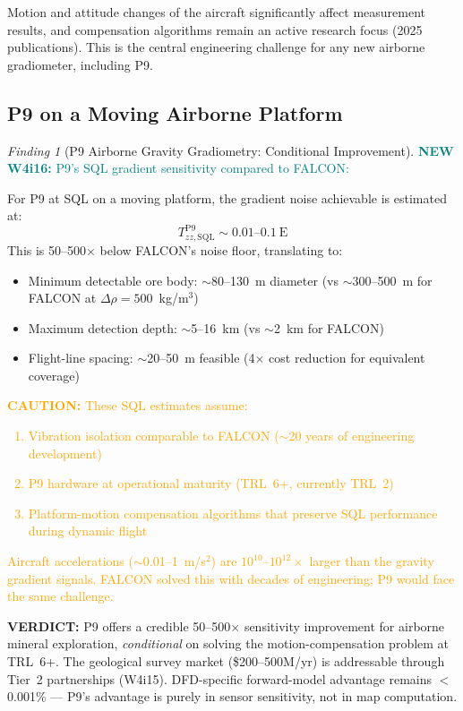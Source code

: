 \documentclass[11pt]{article}
\theoremstyle{definition}
\theoremstyle{remark}
\newtheorem{finding}[theorem]{Finding}
\newcommand{\caution}[1]{\textcolor{orange}{\textbf{CAUTION:} #1}}
\newcommand{\verdict}[1]{\textcolor{green!50!black}{\textbf{VERDICT:} #1}}
\newcommand{\newfinding}[1]{\textcolor{teal}{\textbf{NEW W4i16:} #1}}
\begin{document}
Motion and attitude changes of the aircraft significantly affect
measurement results, and compensation algorithms remain an active
research focus (2025 publications). This is the central engineering
challenge for any new airborne gradiometer, including P9.

\subsection{P9 on a Moving Airborne Platform}

\begin{finding}[P9 Airborne Gravity Gradiometry: Conditional Improvement]
\label{find:agg-p9}
\newfinding{P9's SQL gradient sensitivity compared to FALCON:}

For P9 at SQL on a moving platform, the gradient noise achievable
is estimated at:
\begin{equation}
T_{zz,\mathrm{SQL}}^{\mathrm{P9}} \sim 0.01\text{--}0.1~\mathrm{E}
\end{equation}
This is 50--500$\times$ below FALCON's noise floor, translating to:
\begin{itemize}[nosep]
  \item Minimum detectable ore body: $\sim$80--130~m diameter
    (vs $\sim$300--500~m for FALCON at $\Delta\rho = 500$~kg/m$^3$)
  \item Maximum detection depth: $\sim$5--16~km
    (vs $\sim$2~km for FALCON)
  \item Flight-line spacing: $\sim$20--50~m feasible
    (4$\times$ cost reduction for equivalent coverage)
\end{itemize}

\caution{These SQL estimates assume:
\begin{enumerate}[nosep]
  \item Vibration isolation comparable to FALCON ($\sim$20 years
    of engineering development)
  \item P9 hardware at operational maturity (TRL~6+, currently TRL~2)
  \item Platform-motion compensation algorithms that preserve
    SQL performance during dynamic flight
\end{enumerate}
Aircraft accelerations ($\sim$0.01--1~m/s$^2$) are
$10^{10}$--$10^{12}\times$ larger than the gravity gradient signals.
FALCON solved this with decades of engineering; P9 would face
the same challenge.}

\verdict{P9 offers a credible 50--500$\times$ sensitivity improvement
for airborne mineral exploration, \emph{conditional} on solving
the motion-compensation problem at TRL~6+.
The geological survey market (\$200--500M/yr) is addressable
through Tier~2 partnerships (W4i15). DFD-specific forward-model
advantage remains $<$0.001\% --- P9's advantage is purely in
sensor sensitivity, not in map computation.}
\end{finding}
\end{document}
